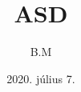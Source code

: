 \documentclass{book}
\begin{document}
\title{ASD}
\author{B.M}
\date{2020. július 7.}
\maketitle
\hulipsum
\end{document}
